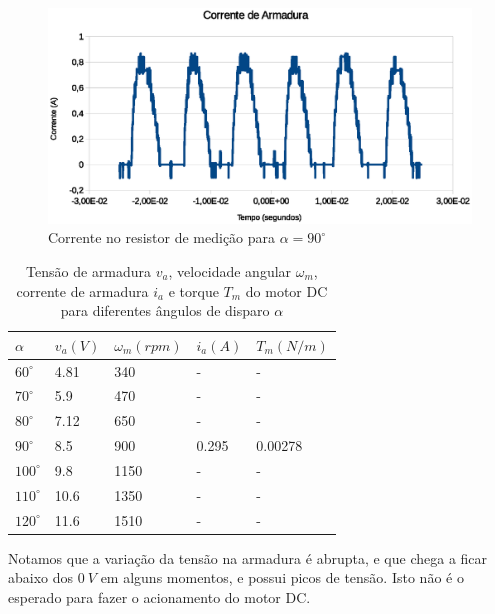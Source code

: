 \documentclass{article}
\begin{document}
\begin{figure}[H]
	\centering
	\includegraphics[width=\linewidth]{Dados/Retificador/corrente}
	\caption{Corrente no resistor de medição para $\alpha=90^\circ$}
	\label{fig:iaret}
\end{figure}

\begin{table}[H]
	\centering
	\caption{Tensão de armadura $v_a$, velocidade angular $\omega_m$, corrente de armadura $i_a$ e torque $T_m$ do motor DC para diferentes ângulos de disparo $\alpha$}
	\label{tab:varet}
	\begin{tabular}{|l|l|l|l|l|}
		\hline
		$\alpha$    & $v_a (V)$ & $\omega_m (rpm)$ & $i_a (A)$ & $T_m (N/m)$ \\ \hline
		$60^\circ$  & 4.81      & 340              & -         & -           \\ \hline
		$70^\circ$  & 5.9       & 470              & -         & -           \\ \hline
		$80^\circ$  & 7.12      & 650              & -         & -           \\ \hline
		$90^\circ$  & 8.5       & 900              & 0.295     & 0.00278     \\ \hline
		$100^\circ$ & 9.8       & 1150             & -         & -           \\ \hline
		$110^\circ$ & 10.6      & 1350             & -         & -           \\ \hline
		$120^\circ$ & 11.6      & 1510             & -         & -           \\ \hline
	\end{tabular}
\end{table}

Notamos que a variação da tensão na armadura é abrupta, e que chega a ficar abaixo dos $0\ V$ em alguns momentos, e possui picos de tensão. Isto não é o esperado para fazer o acionamento do motor DC.
\end{document}

